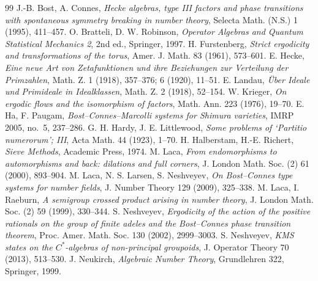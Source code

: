 \documentclass[11pt]{amsart}
\numberwithin{equation}{section}
\theoremstyle{definition}
\theoremstyle{remark}
\begin{document}
\begin{thebibliography}{99}
 J.-B. Bost, A. Connes, \emph{Hecke algebras, type III factors and phase transitions with spontaneous symmetry breaking in number theory}, Selecta Math. (N.S.) 1 (1995), 411--457.
 O. Bratteli, D. W. Robinson, \emph{Operator Algebras and Quantum Statistical Mechanics 2}, 2nd ed., Springer, 1997.
 H. Furstenberg, \emph{Strict ergodicity and transformations of the torus}, Amer. J. Math. 83 (1961), 573--601.
 E. Hecke, \emph{Eine neue Art von Zetafunktionen und ihre Beziehungen zur Verteilung der Primzahlen}, Math. Z. 1 (1918), 357--376; 6 (1920), 11--51.
 E. Landau, \emph{\"Uber Ideale und Primideale in Idealklassen}, Math. Z. 2 (1918), 52--154.
 W. Krieger, \emph{On ergodic flows and the isomorphism of factors}, Math. Ann. 223 (1976), 19--70.
 E. Ha, F. Paugam, \emph{Bost--Connes--Marcolli systems for Shimura varieties}, IMRP 2005, no.~5, 237--286.
 G. H. Hardy, J. E. Littlewood, \emph{Some problems of `Partitio numerorum'; III}, Acta Math. 44 (1923), 1--70.
 H. Halberstam, H.-E. Richert, \emph{Sieve Methods}, Academic Press, 1974.
 M. Laca, \emph{From endomorphisms to automorphisms and back: dilations and full corners}, J. London Math. Soc. (2) 61 (2000), 893--904.
 M. Laca, N. S. Larsen, S. Neshveyev, \emph{On Bost--Connes type systems for number fields}, J. Number Theory 129 (2009), 325--338.
 M. Laca, I. Raeburn, \emph{A semigroup crossed product arising in number theory}, J. London Math. Soc. (2) 59 (1999), 330--344.
 S. Neshveyev, \emph{Ergodicity of the action of the positive rationals on the group of finite adeles and the Bost--Connes phase transition theorem}, Proc. Amer. Math. Soc. 130 (2002), 2999--3003.
 S. Neshveyev, \emph{KMS states on the $C^*$-algebras of non-principal groupoids}, J. Operator Theory 70 (2013), 513--530.
 J. Neukirch, \emph{Algebraic Number Theory}, Grundlehren 322, Springer, 1999.
\end{thebibliography}
\end{document}
